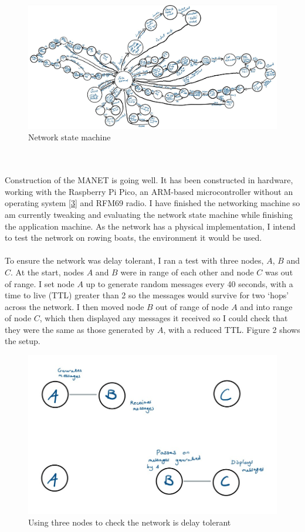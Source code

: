 \documentclass[10pt, a4paper]{article}
\begin{document}
\begin{figure}[h]
\caption{Network state machine}
\begin{center}
\includegraphics[scale=0.4]{net.jpg}
\end{center}
\end{figure} \\ \\
Construction of the MANET is going well. It has been constructed in hardware, working with the Raspberry Pi Pico, an ARM-based microcontroller without an operating system \hyperref[pico]{[3]} and RFM69 radio. I have finished the networking machine so am currently tweaking and evaluating the network state machine while finishing the application machine. As the network has a physical implementation, I intend to test the network on rowing boats, the environment it would be used. \\ \\
To ensure the network was delay tolerant, I ran a test with three nodes, $A$, $B$ and $C$. At the start, nodes $A$ and $B$ were in range of each other and node $C$ was out of range. I set node $A$ up to generate random messages every 40 seconds, with a time to live (TTL) greater than 2 so the messages would survive for two `hops' across the network. I then moved node $B$ out of range of node $A$ and into range of node $C$, which then displayed any messages it received so I could check that they were the same as those generated by $A$, with a reduced TTL. Figure 2 shows the setup.
\begin{figure}[h]
\caption{Using three nodes to check the network is delay tolerant}
\begin{center}
\includegraphics[scale=0.4]{test1.jpg}
\end{center}
\end{figure} \\
\end{document}
